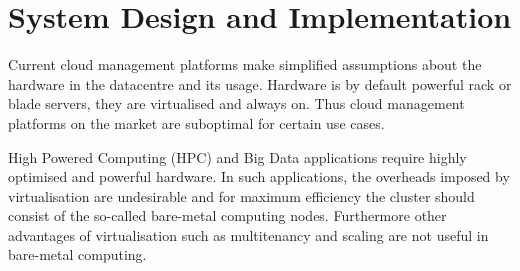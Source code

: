 \section{System Design and Implementation}

Current cloud management platforms make simplified assumptions about the hardware in the datacentre and its usage. Hardware is by default powerful rack or blade servers, they are virtualised and always on. Thus cloud management platforms on the market are suboptimal for certain use cases.

High Powered Computing (HPC) and Big Data applications require highly optimised and powerful hardware. In such applications, the overheads imposed by virtualisation are undesirable and for maximum efficiency the cluster should consist of the so-called bare-metal computing nodes. Furthermore other advantages of virtualisation such as multitenancy and scaling are not useful in bare-metal computing.

